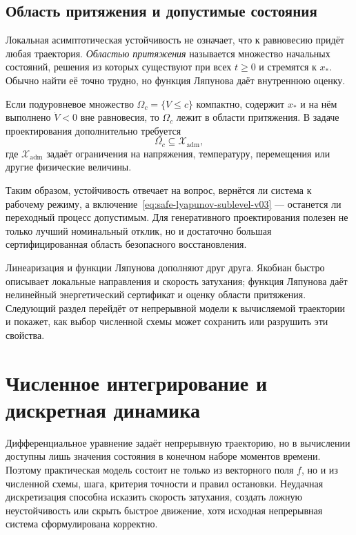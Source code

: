 \subsection{Область притяжения и допустимые состояния}

Локальная асимптотическая устойчивость не означает, что к равновесию придёт любая траектория. \emph{Областью притяжения} называется множество начальных состояний, решения из которых существуют при всех $t\geq0$ и стремятся к $x_*$. Обычно найти её точно трудно, но функция Ляпунова даёт внутреннюю оценку.

Если подуровневое множество $\Omega_c=\{V\leq c\}$ компактно, содержит $x_*$ и на нём выполнено $\dot V<0$ вне равновесия, то $\Omega_c$ лежит в области притяжения. В задаче проектирования дополнительно требуется
\begin{equation}
\label{eq:safe-lyapunov-sublevel-v03}
\Omega_c
\subseteq
\mathcal X_{\mathrm{adm}},
\end{equation}
где $\mathcal X_{\mathrm{adm}}$ задаёт ограничения на напряжения, температуру, перемещения или другие физические величины.

Таким образом, устойчивость отвечает на вопрос, вернётся ли система к рабочему режиму, а включение~\eqref{eq:safe-lyapunov-sublevel-v03} --- останется ли переходный процесс допустимым. Для генеративного проектирования полезен не только лучший номинальный отклик, но и достаточно большая сертифицированная область безопасного восстановления.

Линеаризация и функции Ляпунова дополняют друг друга. Якобиан быстро описывает локальные направления и скорость затухания; функция Ляпунова даёт нелинейный энергетический сертификат и оценку области притяжения. Следующий раздел перейдёт от непрерывной модели к вычисляемой траектории и покажет, как выбор численной схемы может сохранить или разрушить эти свойства.

\section{Численное интегрирование и дискретная динамика}
\label{sec:numerical-integration-discrete-dynamics-v04}

Дифференциальное уравнение задаёт непрерывную траекторию, но в вычислении доступны лишь значения состояния в конечном наборе моментов времени. Поэтому практическая модель состоит не только из векторного поля $f$, но и из численной схемы, шага, критерия точности и правил остановки. Неудачная дискретизация способна исказить скорость затухания, создать ложную неустойчивость или скрыть быстрое движение, хотя исходная непрерывная система сформулирована корректно.

